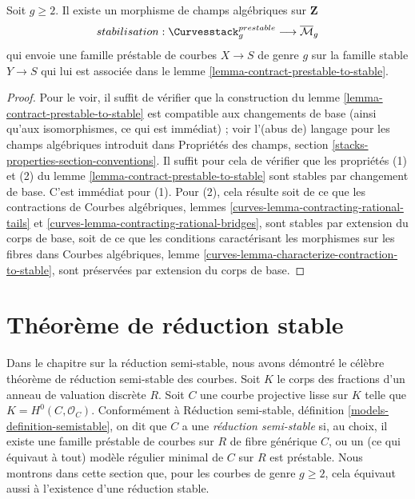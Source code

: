 \begin{lemma}
\label{lemma-stabilization-morphism}
Soit $g \geq 2$. Il existe un morphisme de champs algébriques sur $\mathbf{Z}$
$$
stabilisation :
\Curvesstack^{prestable}_g
\longrightarrow
\overline{\mathcal{M}}_g
$$
qui envoie une famille préstable de courbes $X \to S$ de genre $g$
sur la famille stable $Y \to S$ qui lui est associée dans le
lemme \ref{lemma-contract-prestable-to-stable}.
\end{lemma}

\begin{proof}
Pour le voir, il suffit de vérifier que la construction du
lemme \ref{lemma-contract-prestable-to-stable}
est compatible aux changements de base (ainsi qu'aux isomorphismes, ce qui est immédiat) ;
voir l'(abus de) langage pour les champs algébriques introduit dans
Propriétés des champs, section \ref{stacks-properties-section-conventions}.
Il suffit pour cela de vérifier que les propriétés (1) et (2) du
lemme \ref{lemma-contract-prestable-to-stable} sont stables
par changement de base. C'est immédiat pour (1).
Pour (2), cela résulte soit de ce que les contractions de
Courbes algébriques, lemmes \ref{curves-lemma-contracting-rational-tails} et
\ref{curves-lemma-contracting-rational-bridges},
sont stables par extension du corps de base, soit
de ce que les conditions caractérisant les morphismes sur les fibres dans
Courbes algébriques, lemme \ref{curves-lemma-characterize-contraction-to-stable},
sont préservées par extension du corps de base.
\end{proof}



\section{Théorème de réduction stable}
\label{section-stable-reduction}

\noindent
Dans le chapitre sur la réduction semi-stable, nous avons démontré le célèbre
théorème de réduction semi-stable des courbes. Soit $K$ le corps des fractions
d'un anneau de valuation discrète $R$. Soit $C$ une courbe projective lisse
sur $K$ telle que $K = H^0(C, \mathcal{O}_C)$. Conformément à
Réduction semi-stable, définition \ref{models-definition-semistable},
on dit que $C$ a une {\it réduction semi-stable} si, au choix,
il existe une famille préstable de courbes sur $R$ de fibre générique $C$, ou
un (ce qui équivaut à tout) modèle régulier minimal de $C$ sur $R$ est préstable.
Nous montrons dans cette section que, pour les courbes de genre $g \geq 2$,
cela équivaut aussi à l'existence d'une réduction stable.

